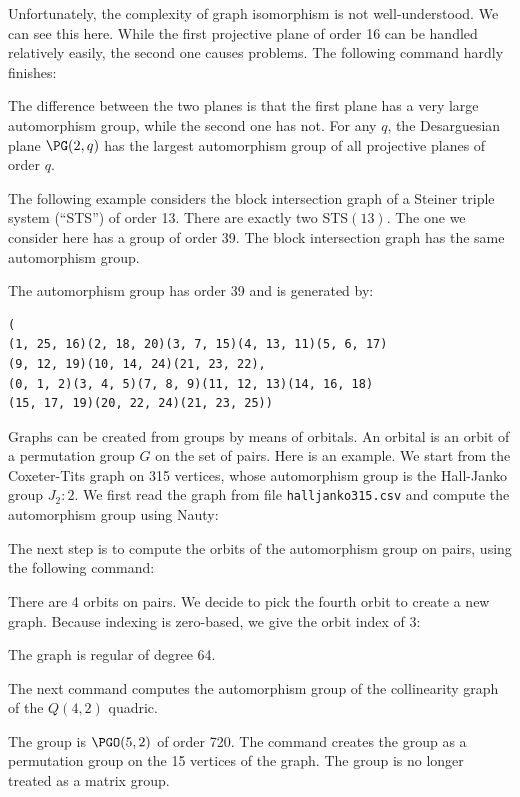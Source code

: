 \bigskip

Unfortunately, the complexity of graph isomorphism is not well-understood. 
We can see this here.
While the first projective plane of order 16 can be handled relatively easily, 
the second one causes problems. The following command hardly finishes:
{\tt

}
The difference between the two planes is that the first plane 
has a very large automorphism group, while the second one has not. 
For any $q$, the Desarguesian plane $\PG(2,q)$ 
has the largest automorphism group 
of all projective planes of order $q$.




\bigskip


The following example considers the block intersection graph of 
a Steiner triple system (``STS'') of order 13. 
There are exactly two STS$(13)$. The one we consider here has a group of order 39. 
The block intersection graph has the same automorphism group.
{\tt

}
The automorphism group has order 39 and is generated by:
\begin{verbatim}
(
(1, 25, 16)(2, 18, 20)(3, 7, 15)(4, 13, 11)(5, 6, 17)
(9, 12, 19)(10, 14, 24)(21, 23, 22), 
(0, 1, 2)(3, 4, 5)(7, 8, 9)(11, 12, 13)(14, 16, 18)
(15, 17, 19)(20, 22, 24)(21, 23, 25))
\end{verbatim}



\bigskip



Graphs can be created from groups by means of orbitals. An orbital is an orbit of a permutation 
group $G$ on the set of pairs. 
Here is an example. We start from the Coxeter-Tits graph on 315 vertices, whose automorphism group 
is the Hall-Janko group $J_2:2.$ 
We first read the graph from file \verb'halljanko315.csv' 
and compute the automorphism group using Nauty:
{\tt

}
The next step is to compute the orbits of the automorphism group on pairs, using the following command:
{\tt

}
There are 4 orbits on pairs. 
We decide to pick the fourth orbit to create a new graph. Because indexing is zero-based, 
we give the orbit index of 3:
{\tt

}
The graph is regular of degree 64. 

\bigskip

The next command computes the automorphism group of the collinearity graph of the $Q(4,2)$ quadric.
{\tt

}
The group is $\PGO(5,2)$ of order 720. 
The command creates the group as a permutation group on the 15 vertices of the graph. 
The group is no longer treated as a matrix group. 

